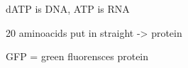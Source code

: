 \chapter{}

dATP is DNA, ATP is RNA

20 aminoacids put in straight -> protein

GFP = green fluorensces protein


